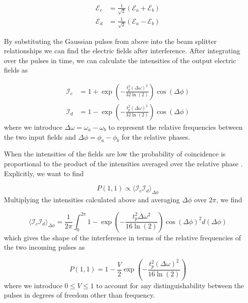 \begin{align}
	\mathcal{E}_c &= \frac{1}{\sqrt{2}}\left(\mathcal{E}_a + \mathcal{E}_b \right)\\
	\mathcal{E}_d &= \frac{1}{\sqrt{2}}\left(\mathcal{E}_a - \mathcal{E}_b \right)
\end{align}

By substituting the Gaussian pulses from above into the beam splitter relationships we can find the electric fields after interference. After integrating over the pulses in time, we can calculate the intensities of the output electric fields as

\begin{align}
	\mathcal{I}_c &= 1 + \exp\left(-\frac{t_p^2(\Delta\omega)^2}{32\ln(2)}\right)\cos(\Delta\phi)\\
	\mathcal{I}_d &= 1 - \exp\left(-\frac{t_p^2(\Delta\omega)^2}{32\ln(2)}\right)\cos(\Delta\phi)
\end{align}
where we introduce $\Delta\omega = \omega_a - \omega_b$ to represent the relative frequencies between the two input fields and $\Delta\phi = \phi_a - \phi_b$ for the relative phases. 

When the intensities of the fields are low the probability of coincidence is proportional to the product of the intensities averaged over the relative phase \cite{Rarity2005}. Explicitly, we want to find

\begin{equation}
	P(1,1) \propto \langle \mathcal{I}_c \mathcal{I}_d\rangle_{\Delta\phi}
\end{equation}
Multiplying the intensities calculated above and averaging $\Delta\phi$ over $2\pi$, we find

\begin{equation}
	\langle \mathcal{I}_c \mathcal{I}_d\rangle_{\Delta\phi} = \frac{1}{2\pi}\int_0^{2\pi} 1 - \exp\left(-\frac{t_p^2 \Delta\omega^2}{16\ln(2)}\right)\cos(\Delta\phi)^2 d(\Delta\phi)
\end{equation} 
which gives the shape of the interference in terms of the relative frequencies of the two incoming pulses as

\begin{equation}
	P(1,1) = 1 - \frac{V}{2} \exp\left( -\frac{t_p^2(\Delta\omega)^2}{16\ln(2)} \right)
\end{equation}
where we introduce $0 \le V \le 1$ to account for any distinguishability between the pulses in degrees of freedom other than frequency. 

